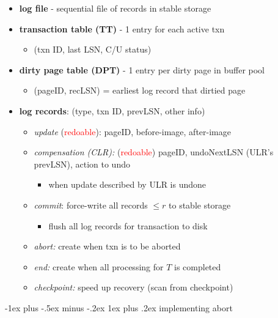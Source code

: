 \documentclass[10pt, landscape]{article}
\makeatletter
\renewcommand{\subsubsection}{\@startsection{subsubsection}{3}{0mm}%
  {-1ex plus -.5ex minus -.2ex}%
  {1ex plus .2ex}%
{\normalfont\small\bfseries}}%
\makeatother
\begin{document}
\begin{multicols*}{4}
  \begin{itemize}
    \item \textbf{log file} - sequential file of records in stable storage
    \item \textbf{transaction table (TT)} - 1 entry for each active txn
          \begin{itemize}
            \item (txn ID, last LSN, C/U status)
          \end{itemize}
    \item \textbf{dirty page table (DPT)} - 1 entry per dirty page in buffer pool
          \begin{itemize}
            \item (pageID, recLSN) = earliest log record that dirtied page
          \end{itemize}
    \item \textbf{log records}: (type, txn ID, prevLSN, other info)
          \begin{itemize}
            \item \textit{update} (\attention \textcolor{red}{redoable}): pageID, before-image, after-image
            \item \textit{compensation (CLR):} (\attention \textcolor{red}{redoable}) pageID, undoNextLSN (ULR's prevLSN), action to undo
                  \begin{itemize}
                    \item when update described by ULR is undone
                  \end{itemize}
            \item \textit{commit}: force-write all records $\leq r$ to stable storage
                  \begin{itemize}
                    \item flush all log records for transaction to disk
                  \end{itemize}
            \item \textit{abort:} create when txn is to be aborted
            \item \textit{end:} create when all processing for $T$ is completed
            \item \textit{checkpoint:} speed up recovery (scan from checkpoint)
          \end{itemize}
  \end{itemize}

  \subsubsection{implementing abort}


\end{multicols*}
\end{document}
